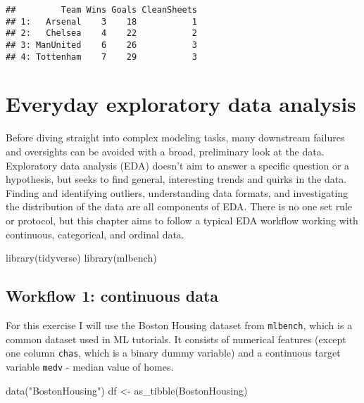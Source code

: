 \documentclass[
]{book}
\newenvironment{Shaded}{\begin{snugshade}}{\end{snugshade}}
\newcommand{\FunctionTok}[1]{\textcolor[rgb]{0.00,0.00,0.00}{#1}}
\newcommand{\NormalTok}[1]{#1}
\newcommand{\OtherTok}[1]{\textcolor[rgb]{0.56,0.35,0.01}{#1}}
\newcommand{\StringTok}[1]{\textcolor[rgb]{0.31,0.60,0.02}{#1}}
\begin{document}
\begin{verbatim}
##         Team Wins Goals CleanSheets
## 1:   Arsenal    3    18           1
## 2:   Chelsea    4    22           2
## 3: ManUnited    6    26           3
## 4: Tottenham    7    29           3
\end{verbatim}

\hypertarget{everyday-exploratory-data-analysis}{%
\chapter{Everyday exploratory data analysis}\label{everyday-exploratory-data-analysis}}

Before diving straight into complex modeling tasks, many downstream failures and oversights can be avoided with a broad, preliminary look at the data. Exploratory data analysis (EDA) doesn't aim to answer a specific question or a hypothesis, but seeks to find general, interesting trends and quirks in the data. Finding and identifying outliers, understanding data formats, and investigating the distribution of the data are all components of EDA. There is no one set rule or protocol, but this chapter aims to follow a typical EDA workflow working with continuous, categorical, and ordinal data.

\begin{Shaded}
\begin{Highlighting}[]
\FunctionTok{library}\NormalTok{(tidyverse)}
\FunctionTok{library}\NormalTok{(mlbench)}
\end{Highlighting}
\end{Shaded}

\hypertarget{workflow-1-continuous-data}{%
\section{Workflow 1: continuous data}\label{workflow-1-continuous-data}}

For this exercise I will use the Boston Housing dataset from \texttt{mlbench}, which is a common dataset used in ML tutorials. It consists of numerical features (except one column \texttt{chas}, which is a binary dummy variable) and a continuous target variable \texttt{medv} - median value of homes.

\begin{Shaded}
\begin{Highlighting}[]
\FunctionTok{data}\NormalTok{(}\StringTok{"BostonHousing"}\NormalTok{)}
\NormalTok{df }\OtherTok{\textless{}{-}} \FunctionTok{as\_tibble}\NormalTok{(BostonHousing)}
\end{Highlighting}
\end{Shaded}
\end{document}
